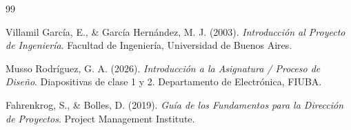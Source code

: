 \begin{thebibliography}{99}

    Villamil García, E., \& García Hernández, M. J. (2003).
    \textit{Introducción al Proyecto de Ingeniería}.
    Facultad de Ingeniería, Universidad de Buenos Aires.

    \vspace{0.15cm}

    Musso Rodríguez, G. A. (2026).
    \textit{Introducción a la Asignatura / Proceso de Diseño}.
    Diapositivas de clase 1 y 2.
    Departamento de Electrónica, FIUBA.

    \vspace{0.15cm}

    Fahrenkrog, S., \& Bolles, D. (2019).
    \textit{Guía de los Fundamentos para la Dirección de Proyectos}.
    Project Management Institute.


\end{thebibliography}
